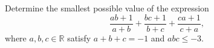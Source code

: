 Determine the smallest possible value of the expression 
$$\frac{ab+1}{a+b} + \frac{bc+1}{b+c} + \frac{ca+1}{c+a},$$
where $a,b,c \in \mathbb{R}$ satisfy $a+b+c = -1$ and $abc \le -3$.

